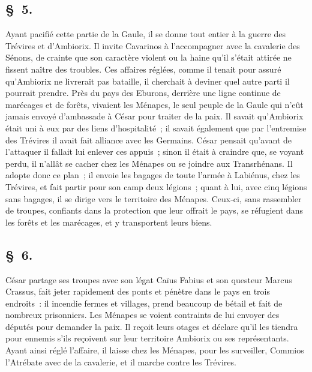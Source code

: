 \documentclass[french,twoside]{book} %
\begin{document}
\subsection[{§ 5.}]{ \textsc{§ 5.} }
\noindent Ayant pacifié cette partie de la Gaule, il se donne tout entier à la guerre des Trévires et d’Ambiorix. Il invite Cavarinos à l’accompagner avec la cavalerie des Sénons, de crainte que son caractère violent ou la haine qu’il s’était attirée ne fissent naître des troubles. Ces affaires réglées, comme il tenait pour assuré qu’Ambiorix ne livrerait pas bataille, il cherchait à deviner quel autre parti il pourrait prendre. Près du pays des Eburons, derrière une ligne continue de marécages et de forêts, vivaient les Ménapes, le seul peuple de la Gaule qui n’eût jamais envoyé d’ambassade à César pour traiter de la paix. Il savait qu’Ambiorix était uni à eux par des liens d’hospitalité ; il savait également que par l’entremise des Trévires il avait fait alliance avec les Germains. César pensait qu’avant de l’attaquer il fallait lui enlever ces appuis ; sinon il était à craindre que, se voyant perdu, il n’allât se cacher chez les Ménapes ou se joindre aux Transrhénans. Il adopte donc ce plan ; il envoie les bagages de toute l’armée à Labiénus, chez les Trévires, et fait partir pour son camp deux légions ; quant à lui, avec cinq légions sans bagages, il se dirige vers le territoire des Ménapes. Ceux-ci, sans rassembler de troupes, confiants dans la protection que leur offrait le pays, se réfugient dans les forêts et les marécages, et y transportent leurs biens.
\subsection[{§ 6.}]{ \textsc{§ 6.} }
\noindent César partage ses troupes avec son légat Caïus Fabius et son questeur Marcus Crassus, fait jeter rapidement des ponts et pénètre dans le pays en trois endroits : il incendie fermes et villages, prend beaucoup de bétail et fait de nombreux prisonniers. Les Ménapes se voient contraints de lui envoyer des députés pour demander la paix. Il reçoit leurs otages et déclare qu’il les tiendra pour ennemis s’ils reçoivent sur leur territoire Ambiorix ou ses représentants. Ayant ainsi réglé l’affaire, il laisse chez les Ménapes, pour les surveiller, Commios l’Atrébate avec de la cavalerie, et il marche contre les Trévires.
\end{document}

